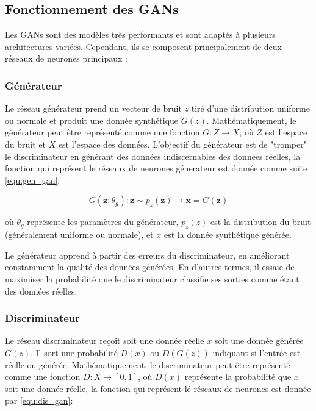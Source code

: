 \subsection{Fonctionnement des GANs}

Les GANs sont des modèles très performants et sont adaptés à plusieurs
architectures variées. Cependant, ils se composent principalement de deux
réseaux de neurones principaux :

\subsubsection{Générateur}

Le réseau générateur prend un vecteur de bruit \( z \) tiré d’une distribution
uniforme ou normale et produit une donnée synthétique \( G(z) \).
Mathématiquement, le générateur peut être représenté comme une fonction \( G :
Z \rightarrow X \), où \( Z \) est l'espace du bruit et \( X \) est l'espace
des données. L’objectif du générateur est de "tromper" le discriminateur en
générant des données indiscernables des données réelles, la fonction qui
représent le réseaux de neurones génerateur est donnée comme suite
\ref{equ:gen_gan}:

\begin{equation}
	G(\mathbf{z}; \theta_g) : \mathbf{z} \sim p_z(\mathbf{z}) \rightarrow \mathbf{x} = G(\mathbf{z})
	\label{equ:gen_gan}
\end{equation}

où \( \theta_g \) représente les paramètres du générateur, \( p_z(z) \) est la
distribution du bruit (généralement uniforme ou normale), et \( x \) est la
donnée synthétique générée.

Le générateur apprend à partir des erreurs du discriminateur, en améliorant
constamment la qualité des données générées. En d'autres termes, il essaie de
maximiser la probabilité que le discriminateur classifie ses sorties comme
étant des données réelles.

\subsubsection{Discriminateur}

Le réseau discriminateur reçoit soit une donnée réelle \( x \) soit une donnée
générée \( G(z) \). Il sort une probabilité \( D(x) \) ou \( D(G(z)) \)
indiquant si l’entrée est réelle ou générée. Mathématiquement, le
discriminateur peut être représenté comme une fonction \( D : X \rightarrow [0,
	1] \), où \( D(x) \) représente la probabilité que \( x \) soit une donnée
réelle, la fonction qui représent lé réseaux de neurones est donnée par
\ref{equ:dis_gan}:

